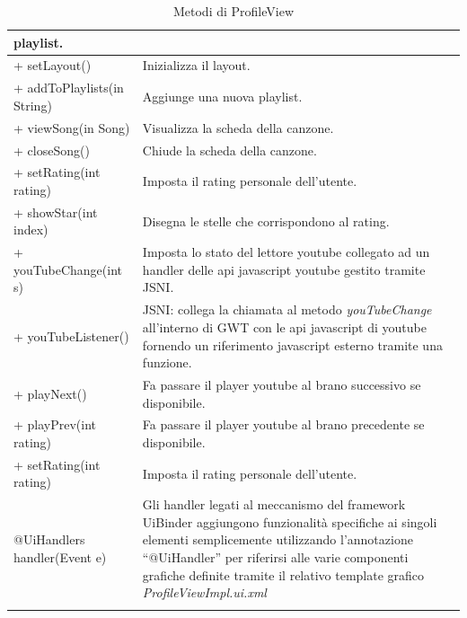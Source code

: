 \begin{longtable}{|p{}|p{}|}
playlist.\\\hline 
+ setLayout() & Inizializza il layout.\\\hline
+ addToPlaylists(in String) & Aggiunge una nuova playlist.\\\hline 
+ viewSong(in Song) & Visualizza la scheda della canzone.\\\hline
+ closeSong() & Chiude la scheda della canzone.\\\hline
+ setRating(int rating) & Imposta il rating personale dell'utente.\\\hline
+ showStar(int index) & Disegna le stelle che corrispondono al rating.\\\hline
+ youTubeChange(int s) & Imposta lo stato del lettore youtube collegato
ad un handler delle api javascript youtube gestito tramite JSNI.\\\hline
+ youTubeListener() & JSNI: collega la chiamata al metodo
\emph{youTubeChange} all'interno di GWT con le api javascript di
youtube fornendo un riferimento javascript esterno tramite una funzione.\\\hline
+ playNext() & Fa passare il player youtube al brano successivo se
disponibile.\\\hline
+ playPrev(int rating) & Fa passare il player youtube al brano
precedente se disponibile.\\\hline
+ setRating(int rating) & Imposta il rating personale dell'utente.\\\hline
@UiHandlers handler(Event e) & Gli handler legati al meccanismo del framework
UiBinder aggiungono funzionalit\`a specifiche ai singoli elementi
semplicemente utilizzando l'annotazione ``@UiHandler'' per riferirsi alle varie
componenti grafiche definite tramite il relativo template grafico
\emph{ProfileViewImpl.ui.xml}\\\hline
\caption{Metodi di ProfileView}
\end{longtable}

